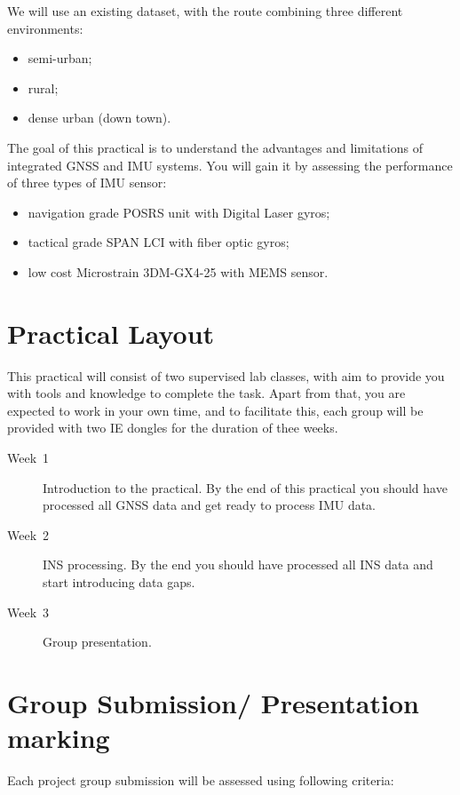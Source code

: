 \documentclass[11pt,fleqn]{book} %
\begin{document}
We will use an existing dataset, with the route combining three different environments:

\begin{itemize}
	\item semi-urban;
	\item rural;
	\item dense urban (down town).
\end{itemize}

The goal of this practical is to understand the advantages and limitations of integrated GNSS and IMU systems. You will gain it by assessing the performance of three types of IMU sensor:

\begin{itemize}
	\item navigation grade POSRS unit with Digital Laser gyros;
	\item tactical grade SPAN LCI with fiber optic gyros;
	\item low cost Microstrain 3DM-GX4-25 with MEMS sensor.
\end{itemize}

\section{Practical Layout}

This practical will consist of two supervised lab classes, with aim to provide you with tools and knowledge to complete the task. Apart from that, you are expected to work in your own time, and to facilitate this, each group will be provided with two IE dongles for the duration of thee weeks.

\begin{description}
	\item [{Week~1}] Introduction to the practical. By the end of this practical you should
	have processed all GNSS data and get ready to process IMU data.
	\item [{Week~2}] INS processing. By the end you should have processed
	all INS data and start introducing data gaps.
	\item [{Week~3}] Group presentation.
\end{description}


\section{Group Submission/ Presentation marking}

Each project group submission will be assessed using following criteria:
\end{document}
